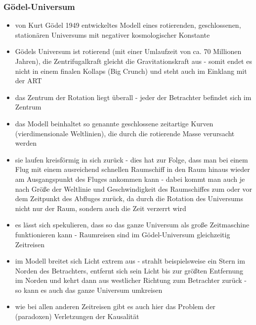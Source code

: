 \documentclass{beamer}
\begin{document}
\begin{frame}\frametitle{Gödel-Universum}

\tiny

\begin{itemize}
\item
von Kurt Gödel 1949 entwickeltes Modell eines rotierenden, geschlossenen, stationären Universums mit negativer kosmologischer Konstante

\item Gödels Universum ist rotierend (mit einer Umlaufzeit von ca. 70 Millionen Jahren), die Zentrifugalkraft gleicht die Gravitationskraft aus - somit endet es nicht in einem finalen Kollaps (Big Crunch) und steht auch im Einklang mit der ART

\item das Zentrum der Rotation liegt überall - jeder der Betrachter befindet sich im Zentrum

\item das Modell beinhaltet so genannte geschlossene zeitartige Kurven (vierdimensionale Weltlinien), die durch die rotierende Masse verursacht werden

\item sie laufen kreisförmig in sich zurück - dies hat zur Folge, dass man bei einem Flug mit einem ausreichend schnellen Raumschiff in den Raum hinaus wieder am Ausgangspunkt des Fluges ankommen kann - dabei kommt man auch je nach Größe der Weltlinie und Geschwindigkeit des Raumschiffes zum oder vor dem Zeitpunkt des Abfluges zurück, da durch die Rotation des Universums nicht nur der Raum, sondern auch die Zeit verzerrt wird

\item es lässt sich spekulieren, dass so das ganze Universum als große Zeitmaschine funktionieren kann - Raumreisen sind im Gödel-Universum gleichzeitig Zeitreisen

\item im Modell breitet sich Licht extrem aus - strahlt beispielsweise ein Stern im Norden des Betrachters, entfernt sich sein Licht bis zur größten Entfernung im Norden und kehrt dann aus westlicher Richtung zum Betrachter zurück - so kann es auch das ganze Universum umkreisen

\item wie bei allen anderen Zeitreisen gibt es auch hier das Problem der (paradoxen) Verletzungen der Kausalität
\end{itemize}

\end{frame}
\end{document}
